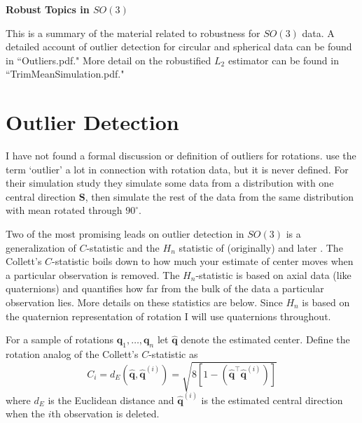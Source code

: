 \documentclass{article}\usepackage[]{graphicx}\usepackage[]{color}
\newcommand{\qest}{{\hat{\bm q}}}
\begin{document}
\begin{center}
\Large{\bf Robust Topics in $SO(3)$}
\end{center}
\normalsize
This is a summary of the material related to robustness for $SO(3)$ data.  A detailed account of outlier detection for circular and spherical data can be found in ``Outliers.pdf."  More detail on the robustified $L_2$ estimator can be found in ``TrimMeanSimulation.pdf."



 
\section{Outlier Detection}\label{sec:outliers}
 
I have not found a formal discussion or definition of outliers for rotations. \cite{fletcher2008} use the term `outlier' a lot in connection with rotation data, but it is never defined.  For their simulation study they simulate some data from a distribution with one central direction $\bm S$, then simulate the rest of the data from the same distribution with mean rotated through $90^\circ$.

Two of the most promising leads on outlier detection in $SO(3)$ is a generalization of \cite{collett1980} $C$-statistic and the $H_n$ statistic of (originally) \cite{best1986} and later \cite{figueiredo2005}.  The Collett's $C$-statistic boils down to how much your estimate of center moves when a particular observation is removed.  The $H_n$-statistic is based on axial data (like quaternions) and quantifies how far from the bulk of the data a particular observation lies.  More details on these statistics are below.  Since $H_n$ is based on the quaternion representation of rotation I will use quaternions throughout. 

For a sample of rotations $\bm q_1,\dots,\bm q_n$ let $\qest$ denote the estimated center.  Define the rotation analog of the Collett's $C$-statistic as 
\begin{equation}\label{eqn:Ci}
C_i=d_E(\qest,\hat{\bm q}^{(i)})=\sqrt{8[1-(\qest^\top\qest^{(i)})]}
\end{equation}
where $d_E$ is the Euclidean distance and $\qest^{(i)}$ is the estimated central direction when the $i$th observation is deleted.  
\end{document}
